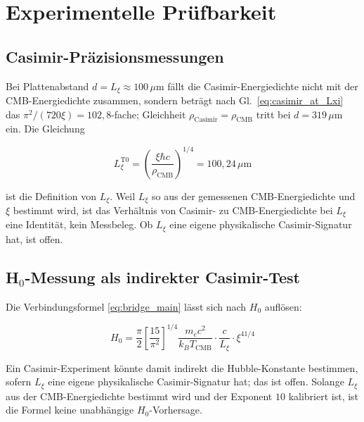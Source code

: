\section{Experimentelle Prüfbarkeit}
\label{sec:vorhersagen}

\subsection{Casimir-Präzisionsmessungen}

Bei Plattenabstand $d = L_\xi \approx 100\,\mu\text{m}$ fällt die Casimir-Energiedichte
nicht mit der CMB-Energiedichte zusammen, sondern beträgt nach
Gl.~\eqref{eq:casimir_at_Lxi} das $\pi^2/(720\xi) = 102{,}8$-fache; Gleichheit
$\rho_\text{Casimir} = \rho_\text{CMB}$ tritt bei $d = 319\,\mu$m ein. Die Gleichung

\begin{equation}
    L_\xi^\text{T0}
    = \left(\frac{\xi\hbar c}{\rho_\text{CMB}}\right)^{1/4}
    = 100{,}24\,\mu\text{m}
    \label{eq:Lxi_prediction}
\end{equation}

ist die Definition von $L_\xi$. Weil $L_\xi$ so aus der gemessenen CMB-Energiedichte
und $\xi$ bestimmt wird, ist das Verhältnis von Casimir- zu CMB-Energiedichte bei
$L_\xi$ eine Identität, kein Messbeleg. Ob $L_\xi$ eine eigene physikalische
Casimir-Signatur hat, ist offen.

\subsection{H\texorpdfstring{$_0$}{0}-Messung als indirekter Casimir-Test}

Die Verbindungsformel \eqref{eq:bridge_main} lässt sich nach $H_0$ auflösen:

\begin{equation}
    H_0 = \frac{\pi}{2}\left[\frac{15}{\pi^2}\right]^{1/4}
          \frac{m_e c^2}{k_B T_\text{CMB}}
          \cdot \frac{c}{L_\xi} \cdot \xi^{41/4}
    \label{eq:H0_from_Casimir}
\end{equation}

Ein Casimir-Experiment könnte damit indirekt die Hubble-Konstante bestimmen,
sofern $L_\xi$ eine eigene physikalische Casimir-Signatur hat; das ist offen. Solange
$L_\xi$ aus der CMB-Energiedichte bestimmt wird und der Exponent $10$ kalibriert ist,
ist die Formel keine unabhängige $H_0$-Vorhersage.

